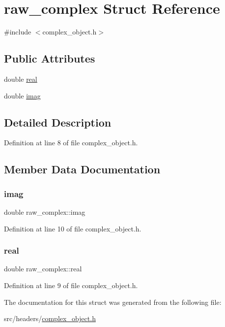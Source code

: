 \hypertarget{structraw__complex}{}\section{raw\+\_\+complex Struct Reference}
\label{structraw__complex}


{\ttfamily \#include $<$complex\+\_\+object.\+h$>$}

\subsection*{Public Attributes}
\begin{DoxyCompactItemize}
\item 
double \hyperlink{structraw__complex_a11372434687f59a6098dc6650182d455}{real}
\item 
double \hyperlink{structraw__complex_af1682dd3da647b1b59af9c74687a6143}{imag}
\end{DoxyCompactItemize}


\subsection{Detailed Description}


Definition at line 8 of file complex\+\_\+object.\+h.



\subsection{Member Data Documentation}
\mbox{\label{structraw__complex_af1682dd3da647b1b59af9c74687a6143}} 
\subsubsection{\texorpdfstring{imag}{imag}}
{\footnotesize\ttfamily double raw\+\_\+complex\+::imag}



Definition at line 10 of file complex\+\_\+object.\+h.

\mbox{\label{structraw__complex_a11372434687f59a6098dc6650182d455}} 
\subsubsection{\texorpdfstring{real}{real}}
{\footnotesize\ttfamily double raw\+\_\+complex\+::real}



Definition at line 9 of file complex\+\_\+object.\+h.



The documentation for this struct was generated from the following file\+:\begin{DoxyCompactItemize}
\item 
src/headers/\hyperlink{complex__object_8h}{complex\+\_\+object.\+h}\end{DoxyCompactItemize}
